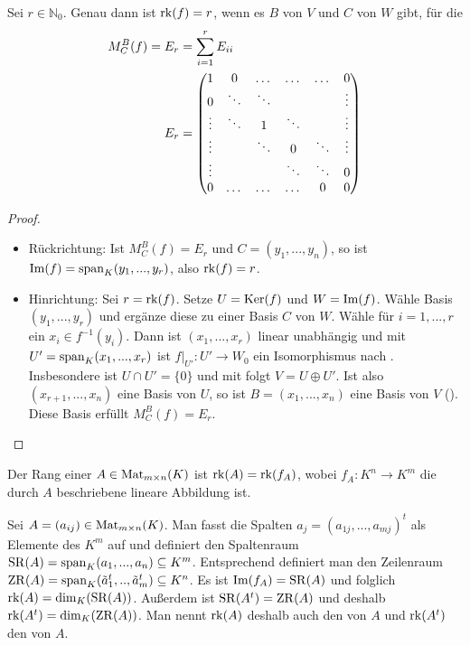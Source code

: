 \begin{proposition}
	Sei $r\in \mathbb N_0$. Genau dann ist $\operatorname{rk}(f)=r$, wenn es $B$ von $V$ und $C$ von $W$ gibt, für die 
	\begin{align}
		M_C^B(f)=E_r&=\sum_{i=1}^r E_{ii}\notag \\ 
		E_r&=\begin{pmatrix}
		1 & 0 & \dots & \dots & \dots & 0 \\
		0 & \ddots & \ddots & \; & \; & \vdots \\
		\vdots & \ddots & 1 & \ddots & \; & \vdots\\
		\vdots & \; & \ddots & 0 & \ddots & \vdots\\
		\vdots & \; & \; & \ddots & \ddots & 0\\
		0 & \dots & \dots & \dots & 0 & 0\\
		\end{pmatrix}\notag
	\end{align}
\end{proposition}
\begin{proof}
	\begin{itemize}
		\item Rückrichtung: Ist $M_C^B(f)=E_r$ und $C=(y_1,...,y_n)$, so ist $\operatorname{Im}(f)=\operatorname{span}_K(y_1,...,y_r)$, also $\operatorname{rk}(f)=r$.
		\item Hinrichtung: Sei $r=\operatorname{rk}(f)$. Setze $U=\operatorname{Ker}(f)$ und $W=\operatorname{Im}(f)$. Wähle Basis $(y_1,...,y_r)$ und ergänze diese zu einer Basis $C$ von 
		$W$. Wähle für $i=1,...,r$ ein $x_i\in f^{-1}(y_i)$. Dann ist $(x_1,...,x_r)$ linear unabhängig und mit $U'=\operatorname{span}_K(x_1,...,x_r)$ ist
		$f|_{U'}:U'\to W_0$ ein Isomorphismus nach . Insbesondere ist $U\cap U'=\{0\}$ und mit  folgt $V=U\oplus U'$. Ist also $(x_{r+1},...,x_n)$ 
		eine Basis von $U$, so ist $B=(x_1,...,x_n)$ eine Basis von $V$ (). Diese Basis erfüllt $M_C^B(f)=E_r$.
	\end{itemize}
\end{proof}

\begin{definition}
	Der Rang einer  $A\in \operatorname{Mat}_{m\times n}(K)$ ist $\operatorname{rk}(A)=\operatorname{rk}(f_A)$, wobei $f_A:K^n\to K^m$ 
	die durch $A$ beschriebene lineare Abbildung ist.
\end{definition}

\begin{remark}
	Sei $A=(a_{ij})\in \operatorname{Mat}_{m\times n}(K)$. Man fasst die Spalten $a_j=(a_{1j},...,a_{mj})^t$ als Elemente des $K^m$ auf 
	und definiert den Spaltenraum $\operatorname{SR}(A)=\operatorname{span}_K(a_1,...,a_n)\subseteq K^m$. Entsprechend definiert man den Zeilenraum $\operatorname{ZR}(A)=\operatorname{span}_K(
	\tilde a_1^t,..,\tilde a_m^t)\subseteq K^n$. Es ist $\operatorname{Im}(f_A)=\operatorname{SR}(A)$ und folglich $\operatorname{rk}(A)=\dim_K(\operatorname{SR}(A))$. Außerdem ist $\operatorname{SR}(A^t)=\operatorname{ZR}(A)$ 
	und deshalb $\operatorname{rk}(A^t)=\dim_K(\operatorname{ZR}(A))$. Man nennt $\operatorname{rk}(A)$ deshalb auch den  von $A$ und $\operatorname{rk}(A^t)$ den  von $A$.
\end{remark}

